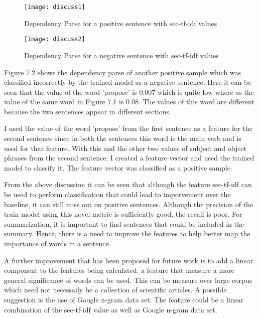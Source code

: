 \begin{figure}[h]
\centering
\texttt{[image: discuss1]} 
\caption{Dependency Parse for a positive sentence with sec-tf-idf values}
\label{fig:dep-discus1}
\end{figure}

\begin{figure}[h]
\centering
\texttt{[image: discuss2]} 
\caption{Dependency Parse for a negative sentence with sec-tf-idf values}
\label{fig:dep-discus2}
\end{figure}

Figure 7.2 shows the dependency parse of another positive sample which was classified incorrectly by the trained model as a negative sentence.
Here it can be seen that the value of the word 'propose' is 0.007 which is quite low where as the value of the same word in Figure 7.1 is 0.08.
The values of this word are different because the two sentences appear in different sections.

I used the value of the word 'propose' from the first sentence as a feature for the second sentence since in both the sentences this word is the main verb and is used for that feature.
With this and the other two values of subject and object phrases from the second sentence, I created a feature vector and used the trained model to classify it.
The feature vector was classified as a positive sample.

From the above discussion it can be seen that although the feature sec-tf-idf can be used to perform classification that could lead to imporvement over the baseline, it can still miss out on positive sentences.
Although the precision of the train model using this novel metric is sufficiently good, the recall is poor.
For summarization, it is important to find sentences that could be included in the summary.
Hence, there is a need to improve the features to help better map the importance of words in a sentence.

A further improvement that has been proposed for future work is to add a linear component to the features being calculated.
a feature that measure a more general significance of words can be used.
This can be measure over large corpus which need not necessaily be a collection of scientific articles.
A possible suggestion is the use of Google n-gram data set.
The feature could be a linear combination of the sec-tf-idf value as well as Google n-gram data set.